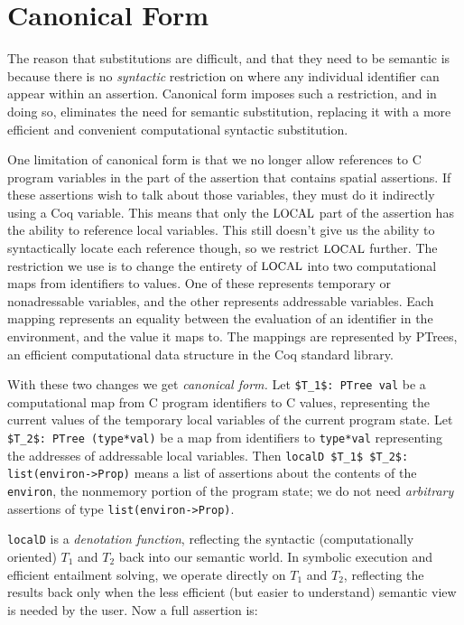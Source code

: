 \documentclass{puthesis}
\begin{document}
\section{Canonical Form}

The reason that substitutions are difficult, and that they need
to be semantic is because there is no \emph{syntactic} restriction
on where any individual identifier can appear within an assertion.
Canonical form imposes such a restriction, and in doing so, eliminates
the need for semantic substitution, replacing it with a more
efficient and convenient computational syntactic substitution.

One limitation of canonical form is that we no longer allow
references to C program variables in the part of the assertion that
contains spatial assertions. If these assertions wish to talk
about those variables, they must do it indirectly using a Coq variable.
This means that only the $\mbox{\small LOCAL}$ part of the assertion has the ability
to reference local variables. This still doesn't give us the ability to
syntactically locate each reference though, so we restrict $\mbox{\small LOCAL}$
further. The restriction we use is to change the entirety of 
$\mbox{\small LOCAL}$ into two computational maps from identifiers to values.
One of these represents temporary or nonadressable variables, and 
the other represents addressable variables. Each mapping represents
an equality between the evaluation of an identifier in the
environment, and the value it maps to. The mappings are represented by PTrees,
an efficient
computational data structure in the Coq standard library. 

With these two changes we get \emph{canonical form.}
Let \lstinline{$T_1$: PTree val} be a computational map from
C program identifiers to C values,
representing the current values of the temporary local
variables of the current program state. Let
\lstinline{$T_2$: PTree (type*val)}
be a map from identifiers to \lstinline{type*val}
representing the addresses of addressable local variables.
Then \lstinline{localD $T_1$ $T_2$: list(environ->Prop)}
means a list of assertions about the contents of the \lstinline{environ},
the nonmemory portion of the program state;
we do not need \emph{arbitrary} 
assertions of type \lstinline{list(environ->Prop)}.

\lstinline{localD} is a \emph{denotation function},
reflecting the syntactic (computationally oriented) $T_1$ and $T_2$
back into our semantic world.  In symbolic execution
and efficient entailment solving, we operate directly on 
$T_1$ and $T_2$, reflecting the results back only when the 
less efficient (but easier to understand) semantic view is
needed by the user. Now a full assertion is:
\end{document}
